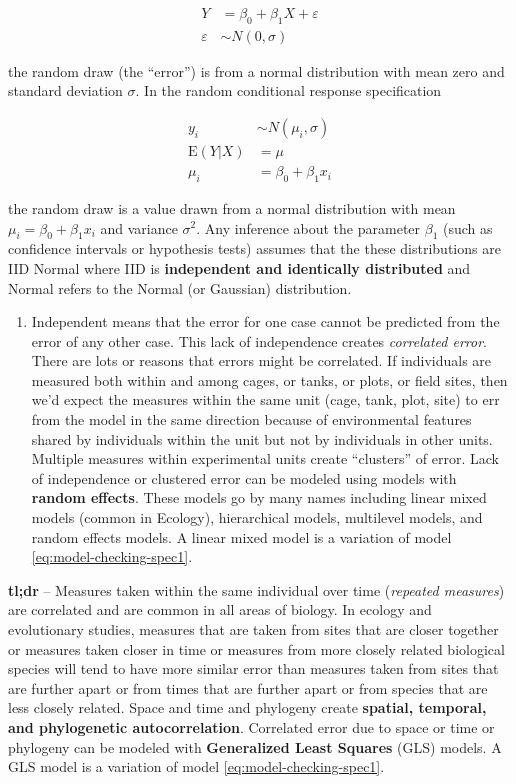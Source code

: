\documentclass[]{book}
\providecommand{\tightlist}{%
  \setlength{\itemsep}{0pt}\setlength{\parskip}{0pt}}
\begin{document}
\begin{align}
Y &= \beta_0 + \beta_1 X + \varepsilon\\
\varepsilon &\sim N(0, \sigma)
\label{eq:model-checking-spec1}
\end{align}

the random draw (the ``error'') is from a normal distribution with mean
zero and standard deviation \(\sigma\). In the random conditional
response specification

\begin{align}
y_i &\sim N(\mu_i, \sigma)\\
\mathrm{E}(Y|X) &= \mu\\
\mu_i &= \beta_0 + \beta_1 x_i
\label{eq:model-checking-spec2}
\end{align}

the random draw is a value drawn from a normal distribution with mean
\(\mu_i = \beta_0 + \beta_1 x_i\) and variance \(\sigma^2\). Any
inference about the parameter \(\beta_1\) (such as confidence intervals
or hypothesis tests) assumes that the these distributions are IID Normal
where IID is \textbf{independent and identically distributed} and Normal
refers to the Normal (or Gaussian) distribution.

\begin{enumerate}
\def\labelenumi{\arabic{enumi}.}
\tightlist
\item
  Independent means that the error for one case cannot be predicted from
  the error of any other case. This lack of independence creates
  \emph{correlated error}. There are lots or reasons that errors might
  be correlated. If individuals are measured both within and among
  cages, or tanks, or plots, or field sites, then we'd expect the
  measures within the same unit (cage, tank, plot, site) to err from the
  model in the same direction because of environmental features shared
  by individuals within the unit but not by individuals in other units.
  Multiple measures within experimental units create ``clusters'' of
  error. Lack of independence or clustered error can be modeled using
  models with \textbf{random effects}. These models go by many names
  including linear mixed models (common in Ecology), hierarchical
  models, multilevel models, and random effects models. A linear mixed
  model is a variation of model \eqref{eq:model-checking-spec1}.
\end{enumerate}

\textbf{tl;dr} -- Measures taken within the same individual over time
(\emph{repeated measures}) are correlated and are common in all areas of
biology. In ecology and evolutionary studies, measures that are taken
from sites that are closer together or measures taken closer in time or
measures from more closely related biological species will tend to have
more similar error than measures taken from sites that are further apart
or from times that are further apart or from species that are less
closely related. Space and time and phylogeny create \textbf{spatial,
temporal, and phylogenetic autocorrelation}. Correlated error due to
space or time or phylogeny can be modeled with \textbf{Generalized Least
Squares} (GLS) models. A GLS model is a variation of model
\eqref{eq:model-checking-spec1}.
\end{document}
